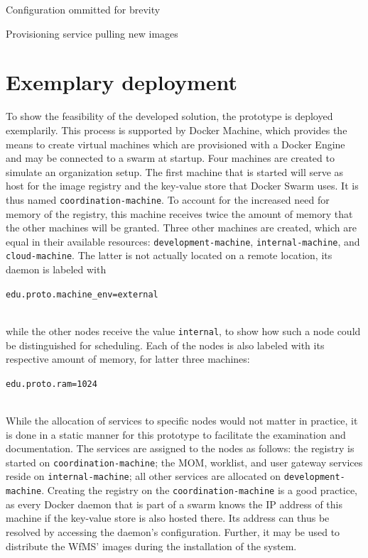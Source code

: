       \begin{listing}[!htbp]
        \inputminted[firstline=19,lastline=29,fontsize=\footnotesize,linenos=true,numberblanklines=true,showspaces=false,breaklines=true,baselinestretch=1]{ruby}{../code/provisioner/provisioner.rb}
        \caption*{Configuration ommitted for brevity}
        \caption{Provisioning service pulling new images}
        \label{lst:provisioner_loop}
      \end{listing}


\section{Exemplary deployment} %
\label{sec:exemplary_deployment}
  To show the feasibility of the developed solution, the prototype is deployed exemplarily. This process is supported by Docker Machine, which provides the means to create virtual machines which are provisioned with a Docker Engine and may be connected to a swarm at startup. Four machines are created to simulate an organization setup. The first machine that is started will serve as host for the image registry and the key-value store that Docker Swarm uses. It is thus named \texttt{coordination-machine}. To account for the increased need for memory of the registry, this machine receives twice the amount of memory that the other machines will be granted. Three other machines are created, which are equal in their available resources: \texttt{development-machine}, \texttt{internal-machine}, and \texttt{cloud-machine}. The latter is not actually located on a remote location, its daemon is labeled with
  \\ [0.5ex]
  \centerline{\texttt{edu.proto.machine\_env=external}}
  \\ [0.5ex]
  while the other nodes receive the value \texttt{internal}, to show how such a node could be distinguished for scheduling. Each of the nodes is also labeled with its respective amount of memory, \eg for latter three machines:
  \\ [0.5ex]
  \centerline{\texttt{edu.proto.ram=1024}}
  \\ [0.5ex]
  While the allocation of services to specific nodes would not matter in practice, it is done in a static manner for this prototype to facilitate the examination and documentation.
  The services are assigned to the nodes as follows: the registry is started on \texttt{coordination-machine}; the \ac{MOM}, worklist, and user gateway services reside on \texttt{internal-machine}; all other services are allocated on \texttt{development-machine}. Creating the registry on the \texttt{coordination-machine} is a good practice, as every Docker daemon that is part of a swarm knows the \ac{IP} address of this machine if the key-value store is also hosted there. Its address can thus be resolved by accessing the daemon's configuration. Further, it may be used to distribute the \ac{WfMS}' images during the installation of the system.

